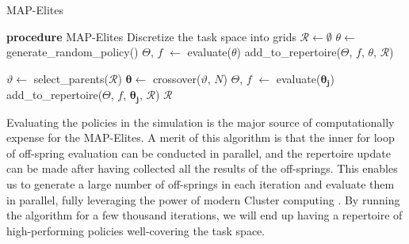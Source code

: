 \begin{algorithm}
\caption{MAP-Elites}
\begin{algorithmic}
\STATE \textbf{procedure} MAP-Elites
\STATE Discretize the task space into grids
\STATE $\mathcal{R} \leftarrow \emptyset$ 
\STATE $\theta \leftarrow $ generate{\_}random{\_}policy()
\STATE $\Theta$, $f$ $\leftarrow$ evaluate($\theta$) 
\STATE add{\_}to{\_}repertoire($\Theta$, $f$, $\theta$, $\mathcal{R}$) 
\ENDFOR

\STATE {}
\STATE $\vartheta \leftarrow$ select{\_}parents($\mathcal{R}$)
\STATE $\bm{\theta} \leftarrow$ crossover($\vartheta$, $N$) 
\STATE $\Theta$, $f$ $\leftarrow$ evaluate($\bm{\theta_j}$)
\STATE add{\_}to{\_}repertoire($\Theta$, $f$, $\bm{\theta_j}$, $\mathcal{R}$)
\ENDFOR
\ENDFOR
\RETURN $\mathcal{R}$ 
\end{algorithmic}
\label{MAP-Elites}
\end{algorithm}
\noindent
Evaluating the policies in the simulation is the major source of computationally expense for the MAP-Elites.
A merit of this algorithm is that the inner for loop of off-spring evaluation can be conducted in parallel, and the repertoire update can be made after having collected all the results of the off-springs.
This enables us to generate a large number of off-springs in each iteration and evaluate them in parallel, fully leveraging the power of modern Cluster computing \cite{Q-Dax}.
By running the algorithm for a few thousand iterations, we will end up having a repertoire of high-performing policies well-covering the task space.

